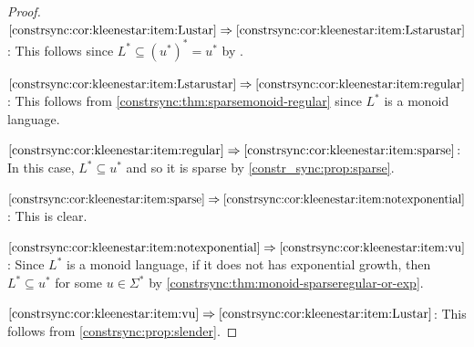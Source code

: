 \begin{proof}
$\ref{constrsync:cor:kleenestar:item:Lustar}\Rightarrow\ref{constrsync:cor:kleenestar:item:Lstarustar}$: This follows since $L^* \subseteq (u^*)^* = u^*$ by .

$\ref{constrsync:cor:kleenestar:item:Lstarustar}\Rightarrow\ref{constrsync:cor:kleenestar:item:regular}$: This follows from \cref{constrsync:thm:sparsemonoid-regular} since $L^*$ is a monoid language.

$\ref{constrsync:cor:kleenestar:item:regular}\Rightarrow\ref{constrsync:cor:kleenestar:item:sparse}$: In this case, $L^* \subseteq u^*$ and so it is sparse by \cref{constr_sync:prop:sparse}.

$\ref{constrsync:cor:kleenestar:item:sparse}\Rightarrow\ref{constrsync:cor:kleenestar:item:notexponential}$: This is clear.

$\ref{constrsync:cor:kleenestar:item:notexponential}\Rightarrow\ref{constrsync:cor:kleenestar:item:vu}$: Since $L^*$ is a monoid language, if it does not has exponential growth,
then $L^* \subseteq u^*$ for some $u \in \Sigma^*$ by \cref{constrsync:thm:monoid-sparseregular-or-exp}.

$\ref{constrsync:cor:kleenestar:item:vu}\Rightarrow\ref{constrsync:cor:kleenestar:item:Lustar}$: This follows from \cref{constrsync:prop:slender}.
\end{proof}